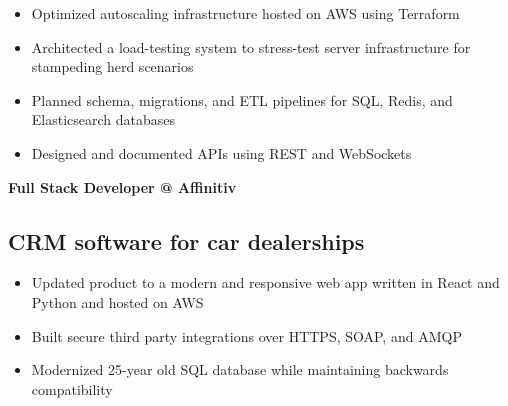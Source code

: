 \documentclass[11pt]{article}
\makeatletter
\newcommand{\experienceheading}[4]{%
    \noindent\textbf{\large\overlock #1 @ #2}
    \hfill
    \settowidth{\dimen0}{ 0000\textendash0000}
    \makebox[\dimen0][l]{ \daterange{#3}{#4}
    }
}
\newcommand{\daterange}[2]{%
  \ifstrempty{#2}{#1}{#1\textendash#2}%
}
\makeatother
\begin{document}
\begin{paracol}{2}
\begin{rightcolumn}
\begin{itemize}
    \item Optimized autoscaling infrastructure hosted on AWS using Terraform

    \item Architected a load-testing system to stress-test server infrastructure for stampeding herd scenarios

    \item Planned schema, migrations, and ETL pipelines for SQL, Redis, and Elasticsearch databases

    \item Designed and documented APIs using REST and WebSockets

\end{itemize}


\experienceheading{Full Stack Developer}{Affinitiv}{2016}{2017}
\subsection{CRM software for car dealerships}
\begin{itemize}

    \item Updated product to a modern and responsive web app written in React and Python and hosted on AWS

    \item Built secure third party integrations over HTTPS, SOAP, and AMQP

    \item Modernized 25-year old SQL database while maintaining backwards compatibility

\end{itemize}


\end{rightcolumn}
\end{paracol}
\end{document}
